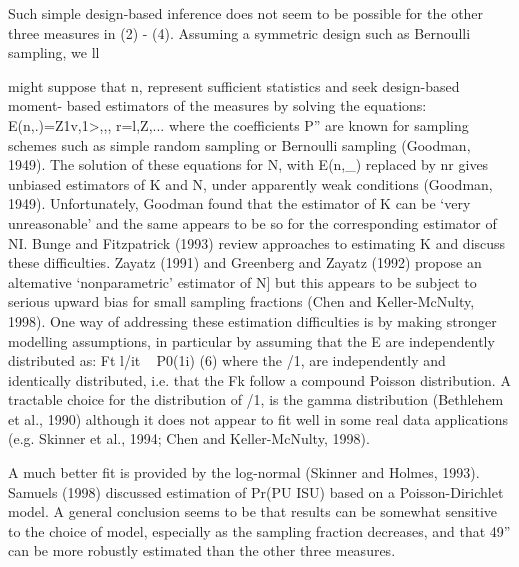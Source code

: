 Such simple design-based inference does not seem to be possible for the other three
measures in (2) - (4). Assuming a symmetric design such as Bernoulli sampling, we
ll



might suppose that n,  represent sufficient statistics and seek design-based moment-
based estimators of the measures by solving the equations:
E(n,.)=Z1v,1>,,, r=l,Z,...
where the coefficients P” are known for sampling schemes such as simple random
sampling or Bernoulli sampling (Goodman, 1949). The solution of these equations for N,
with E(n,_) replaced by nr gives unbiased estimators of K and N, under apparently
weak conditions (Goodman, 1949). Unfortunately, Goodman found that the estimator of
K can be ‘very unreasonable’ and the same appears to be so for the corresponding
estimator of NI. Bunge and Fitzpatrick (1993) review approaches to estimating K and
discuss these difficulties. Zayatz (1991) and Greenberg and Zayatz (1992) propose an
altemative ‘nonparametric’ estimator of N] but this appears to be subject to serious
upward bias for small sampling fractions (Chen and Keller-McNulty, 1998).
One way of addressing these estimation difficulties is by making stronger
modelling assumptions, in particular by assuming that the E are independently
distributed as:
Ft l/it ~ P0(1i) (6)
where the /1, are independently and identically distributed, i.e. that the Fk follow a
compound Poisson distribution. A tractable choice for the distribution of /1, is the
gamma distribution (Bethlehem et al., 1990) although it does not appear to fit well in
some real data applications (e.g. Skinner et al., 1994; Chen and Keller-McNulty, 1998).

A much better fit is provided by the log-normal (Skinner and Holmes, 1993). Samuels
(1998) discussed estimation of Pr(PU ISU) based on a Poisson-Dirichlet model. A
general conclusion seems to be that results can be somewhat sensitive to the choice of
model, especially as the sampling fraction decreases, and that 49” can be more robustly
estimated than the other three measures.

